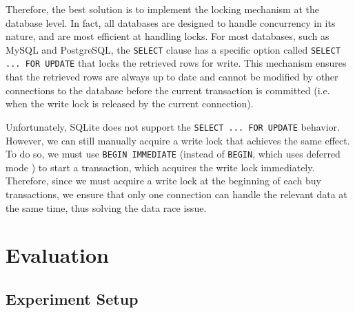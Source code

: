 \documentclass[letterpaper,11pt,twocolumn]{article}
\begin{document}
Therefore, the best solution is to implement the locking mechanism at the database level. In fact, all databases are designed to handle concurrency in its nature, and are most efficient at handling locks. For most databases, such as MySQL and PostgreSQL, the \texttt{SELECT} clause has a specific option called \texttt{SELECT ... FOR UPDATE} \cite{mysql}\cite{postgres} that locks the retrieved rows for write. This mechanism ensures that the retrieved rows are always up to date and cannot be modified by other connections to the database before the current transaction is committed (i.e. when the write lock is released by the current connection).

Unfortunately, SQLite does not support the \texttt{SELECT ... FOR UPDATE} behavior. However, we can still manually acquire a write lock that achieves the same effect. To do so, we must use \texttt{BEGIN IMMEDIATE} (instead of \texttt{BEGIN}, which uses deferred mode \cite{sqlite}) to start a transaction, which acquires the write lock immediately.
Therefore, since we must acquire a write lock at the beginning of each buy transactions, we ensure that only one connection can handle the relevant data at the same time, thus solving the data race issue.








\section{Evaluation}

\subsection{Experiment Setup}
\end{document}

